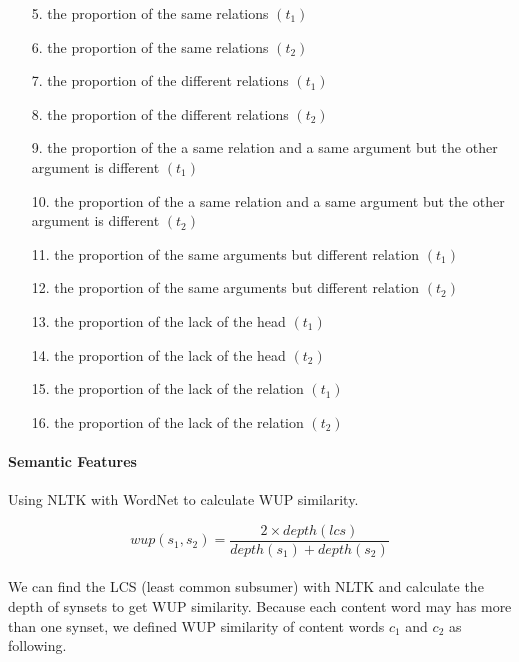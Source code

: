 \documentclass[12pt]{article}
\begin{document}
\begin{CJK*}{UTF8}{bkai}
\begin{spacing}{1.77}
\begin{enumerate}
    \item[ 5.] the proportion of the same relations $(t_1)$
    \item[ 6.] the proportion of the same relations $(t_2)$
    \item[ 7.] the proportion of the different relations $(t_1)$
    \item[ 8.] the proportion of the different relations $(t_2)$
    \item[ 9.] the proportion of the a same relation and a same argument but the other argument is different $(t_1)$
    \item[10.] the proportion of the a same relation and a same argument but the other argument is different $(t_2)$
    \item[11.] the proportion of the same arguments but different relation $(t_1)$
    \item[12.] the proportion of the same arguments but different relation $(t_2)$
    \item[13.] the proportion of the lack of the head $(t_1)$
    \item[14.] the proportion of the lack of the head $(t_2)$
    \item[15.] the proportion of the lack of the relation $(t_1)$
    \item[16.] the proportion of the lack of the relation $(t_2)$
\end{enumerate}

\paragraph{Semantic Features}
Using NLTK\cite{nltk} with WordNet\cite{wordnet} to calculate WUP similarity\cite{wu-palmer-1994-verb}.

\begin{equation}
  wup(s_1,s_2)=\frac{2\times depth(lcs)}{depth(s_1)+depth(s_2)}
\end{equation}

\paragraph{}
We can find the LCS (least common subsumer) with NLTK and calculate the depth of synsets to get WUP similarity. Because each content word may has more than one synset, we defined WUP similarity of content words $c_1$ and $c_2$ as following.


\end{spacing}
\end{CJK*}
\end{document}
